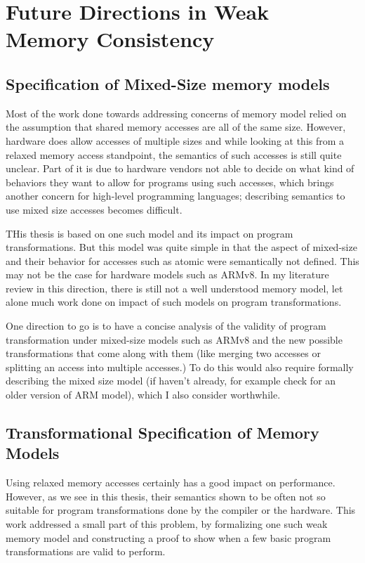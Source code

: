 \section{Future Directions in Weak Memory Consistency}

    \subsection{Specification of Mixed-Size memory models}

        Most of the work done towards addressing concerns of memory model relied on the assumption that shared memory accesses are all of the same size. However, hardware does allow accesses of multiple sizes and while looking at this from a relaxed memory access standpoint, the semantics of such accesses is still quite unclear. Part of it is due to hardware vendors not able to decide on what kind of behaviors they want to allow for programs using such accesses, which brings another concern for high-level programming languages; describing semantics to use mixed size accesses becomes difficult. 

        THis thesis is based on one such model and its impact on program transformations. But this model was quite simple in that the aspect of mixed-size and their behavior for accesses such as atomic were semantically not defined. This may not be the case for hardware models such as ARMv8. In my literature review in this direction, there is still not a well understood memory model, let alone much work done on impact of such models on program transformations. 

        One direction to go is to have a concise analysis of the validity of program transformation under mixed-size models such as ARMv8 and the new possible transformations that come along with them (like merging two accesses or splitting an access into multiple accesses.) To do this would also require formally describing the mixed size model (if haven't already, for example check \cite{DBLP:conf/popl/FlurSPNMGSBS17} for an older version of ARM model), which I also consider worthwhile.  

    \subsection{Transformational Specification of Memory Models}

        Using relaxed memory accesses certainly has a good impact on performance. However, as we see in this thesis, their semantics shown to be often not so suitable for program transformations done by the compiler or the hardware. This work addressed a small part of this problem, by formalizing one such weak memory model and constructing a proof to show when a few basic program transformations are valid to perform. 

